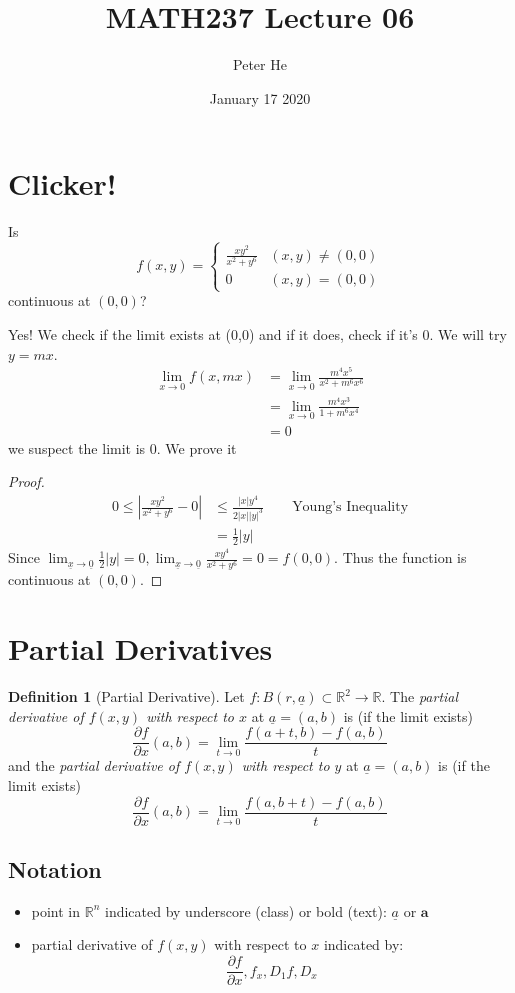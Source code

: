 \documentclass[12pt]{article}
\title{MATH237 Lecture 06}
\author{Peter He}
\date{January 17 2020}
\theoremstyle{definition}
\newtheorem{definition}{Definition}[section]
\newcommand{\R}{\mathbb{R}}
\begin{document}
\maketitle

\section{Clicker!}
Is \[f(x,y)=\begin{cases}\frac{xy^2}{x^2+y^6}&(x,y)\neq(0,0)\\0&(x,y)=(0,0)\end{cases}\] continuous at $(0,0)$?

Yes! We check if the limit exists at (0,0) and if it does, check if it's 0. We will try $y=mx$.
\begin{align*}
    \lim_{x\to 0}f(x,mx)&=\lim_{x\to 0}\frac{m^4x^5}{x^2+m^6x^6}\\
    &=\lim_{x\to 0}\frac{m^4x^3}{1+m^6x^4}\\
    &=0
\end{align*}
we suspect the limit is 0. We prove it 
\begin{proof}
    \begin{align*}
        0\leq \left|\frac{xy^2}{x^2+y^6} -0\right|&\leq \frac{|x|y^4}{2|x||y|^3}\qquad\text{Young's Inequality}\\
        &=\frac{1}{2}|y|
    \end{align*}
    Since $\lim_{\underline x\to\underline 0}\frac{1}{2}|y|=0, \lim_{\underline x\to\underline 0}\frac{xy^4}{x^2+y^6}=0=f(0,0)$. Thus the function is continuous at $(0,0)$.
\end{proof}

\section{Partial Derivatives}
\begin{definition}[Partial Derivative]
    Let $f:B(r,\underline a)\subset \R^2\to\R$. The \textit{partial derivative of $f(x,y)$ with respect to $x$} at $\underline a=(a,b)$ is (if the limit exists)
    \[\frac{\partial f}{\partial x}(a,b)=\lim_{t\to 0}\frac{f(a+t,b)-f(a,b)}{t}\]
    and the \textit{partial derivative of $f(x,y)$ with respect to $y$} at $\underline a=(a,b)$ is (if the limit exists)
    \[\frac{\partial f}{\partial x}(a,b)=\lim_{t\to 0}\frac{f(a,b+t)-f(a,b)}{t}\]
\end{definition}

\subsection{Notation}
\begin{itemize}
    \item point in $\R^n$ indicated by underscore (class) or bold (text): $\underline a$ or $\mathbf a$
    \item partial derivative of $f(x,y)$ with respect to $x$ indicated by: \[\frac{\partial f}{\partial x}, f_x, D_1f, D_x\]
\end{itemize}
\end{document}
